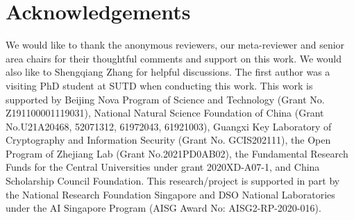 \documentclass[11pt]{article}
\begin{document}
\section*{Acknowledgements}
We would like to thank the anonymous reviewers, our meta-reviewer and senior area chairs for their thoughtful comments and support on this work. We would also like to Shengqiang Zhang for helpful discussions. 
The first author was a visiting PhD student at SUTD when conducting this work. This work is supported by Beijing Nova Program of Science and Technology (Grant No. Z191100001119031), National Natural Science Foundation of China (Grant No.U21A20468, 52071312, 61972043, 61921003), Guangxi Key Laboratory of Cryptography and Information Security (Grant No. GCIS202111), the Open Program of Zhejiang Lab (Grant No.2021PD0AB02), the Fundamental Research Funds for the Central Universities under grant 2020XD-A07-1, and China Scholarship Council Foundation. This research/project is supported in part by the National Research Foundation Singapore and DSO National Laboratories under the AI Singapore Program (AISG Award No: AISG2-RP-2020-016).

\begin{comment}
	\section*{Ethics Statement}
	Scientific work published at EMNLP 2022 must comply with the \href{https://www.aclweb.org/portal/content/acl-code-ethics}{ACL Ethics Policy}. We encourage all authors to include an explicit ethics statement on the broader impact of the work, or other ethical considerations after the conclusion but before the references. The ethics statement will not count toward the page limit (8 pages for long, 4 pages for short papers).
	
	\section*{Acknowledgements}
	This document has been adapted by Yue Zhang, Ryan Cotterell and Lea Frermann from the style files used for earlier ACL and NAACL proceedings, including those for 
	ACL 2020 by Steven Bethard, Ryan Cotterell and Rui Yan,
	ACL 2019 by Douwe Kiela and Ivan Vuli\'{c},
	NAACL 2019 by Stephanie Lukin and Alla Roskovskaya, 
	ACL 2018 by Shay Cohen, Kevin Gimpel, and Wei Lu, 
	NAACL 2018 by Margaret Mitchell and Stephanie Lukin,
	Bib\TeX{} suggestions for (NA)ACL 2017/2018 from Jason Eisner,
	ACL 2017 by Dan Gildea and Min-Yen Kan, NAACL 2017 by Margaret Mitchell, 
	ACL 2012 by Maggie Li and Michael White, 
	ACL 2010 by Jing-Shin Chang and Philipp Koehn, 
	ACL 2008 by Johanna D. Moore, Simone Teufel, James Allan, and Sadaoki Furui, 
	ACL 2005 by Hwee Tou Ng and Kemal Oflazer, 
	ACL 2002 by Eugene Charniak and Dekang Lin, 
	and earlier ACL and EACL formats written by several people, including
	John Chen, Henry S. Thompson and Donald Walker.
	Additional elements were taken from the formatting instructions of the \emph{International Joint Conference on Artificial Intelligence} and the \emph{Conference on Computer Vision and Pattern Recognition}.
\end{comment}
\end{document}
